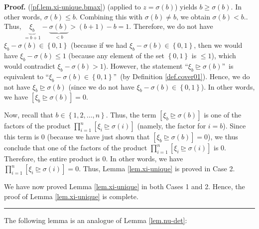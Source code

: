\documentclass[numbers=enddot,12pt,final,onecolumn,notitlepage,english]{scrartcl}%
\theoremstyle{definition}
\newenvironment{proof}[1][Proof]{\noindent\textbf{#1.} }{\ \rule{0.5em}{0.5em}}
\let\prodnonlimits\prod
\renewcommand{\prod}{\prodnonlimits\limits}
\newenvironment{verlong}{}{}
\begin{document}
\begin{verlong}
\begin{proof}
{(\ref{pf.lem.xi-unique.bmax}) (applied to $z=\sigma\left(  b\right)  $) yields
$b\geq\sigma\left(  b\right)  $. In other words, $\sigma\left(  b\right)  \leq
b$. Combining this with $\sigma\left(  b\right)  \neq b$, we obtain
$\sigma\left(  b\right)  <b$.}. Thus, $\underbrace{\xi_{b}}_{=b+1}%
-\underbrace{\sigma\left(  b\right)  }_{<b}>\left(  b+1\right)  -b=1$.
Therefore, we do not have $\xi_{b}-\sigma\left(  b\right)  \in\left\{
0,1\right\}  $ (because if we had $\xi_{b}-\sigma\left(  b\right)  \in\left\{
0,1\right\}  $, then we would have $\xi_{b}-\sigma\left(  b\right)  \leq1$
(because any element of the set $\left\{  0,1\right\}  $ is $\leq1$), which
would contradict $\xi_{b}-\sigma\left(  b\right)  >1$). However, the statement
\textquotedblleft$\xi_{b}\trianglerighteq\sigma\left(  b\right)
$\textquotedblright\ is equivalent to \textquotedblleft$\xi_{b}-\sigma\left(
b\right)  \in\left\{  0,1\right\}  $\textquotedblright\ (by Definition
\ref{def.cover01}). Hence, we do not have $\xi_{b}\trianglerighteq
\sigma\left(  b\right)  $ (since we do not have $\xi_{b}-\sigma\left(
b\right)  \in\left\{  0,1\right\}  $). In other words, we have $\left[
\xi_{b}\trianglerighteq\sigma\left(  b\right)  \right]  =0$.

Now, recall that $b\in\left\{  1,2,\ldots,n\right\}  $. Thus, the term
$\left[  \xi_{b}\trianglerighteq\sigma\left(  b\right)  \right]  $ is one of
the factors of the product $\prod_{i=1}^{n}\left[  \xi_{i}\trianglerighteq
\sigma\left(  i\right)  \right]  $ (namely, the factor for $i=b$). Since this
term is $0$ (because we have just shown that $\left[  \xi_{b}\trianglerighteq
\sigma\left(  b\right)  \right]  =0$), we thus conclude that one of the
factors of the product $\prod_{i=1}^{n}\left[  \xi_{i}\trianglerighteq
\sigma\left(  i\right)  \right]  $ is $0$. Therefore, the entire product is
$0$. In other words, we have $\prod_{i=1}^{n}\left[  \xi_{i}\trianglerighteq
\sigma\left(  i\right)  \right]  =0$. Thus, Lemma \ref{lem.xi-unique} is
proved in Case 2.

We have now proved Lemma \ref{lem.xi-unique} in both Cases 1 and 2. Hence, the
proof of Lemma \ref{lem.xi-unique} is complete.
\end{proof}
\end{verlong}

The following lemma is an analogue of Lemma \ref{lem.nu-det}:
\end{document}
